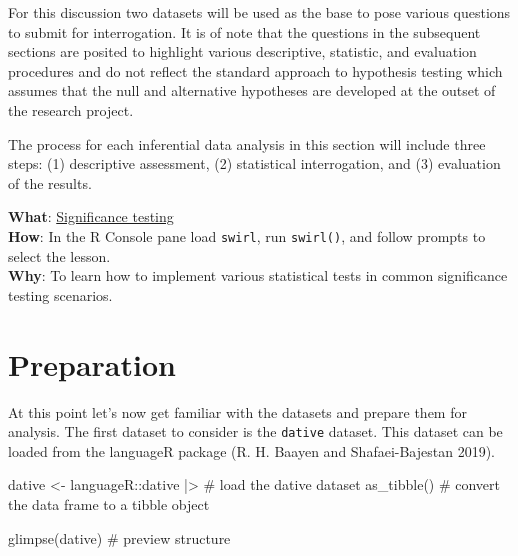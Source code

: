\documentclass[
  letterpaper,
]{latex/krantz}
\newenvironment{Shaded}{\begin{snugshade}}{\end{snugshade}}
\newcommand{\CommentTok}[1]{\textcolor[rgb]{0.37,0.37,0.37}{#1}}
\newcommand{\FunctionTok}[1]{\textcolor[rgb]{0.28,0.35,0.67}{#1}}
\newcommand{\NormalTok}[1]{\textcolor[rgb]{0.00,0.23,0.31}{#1}}
\newcommand{\OtherTok}[1]{\textcolor[rgb]{0.00,0.23,0.31}{#1}}
\newcommand{\SpecialCharTok}[1]{\textcolor[rgb]{0.37,0.37,0.37}{#1}}
\begin{document}
For this discussion two datasets will be used as the base to pose
various questions to submit for interrogation. It is of note that the
questions in the subsequent sections are posited to highlight various
descriptive, statistic, and evaluation procedures and do not reflect the
standard approach to hypothesis testing which assumes that the null and
alternative hypotheses are developed at the outset of the research
project.

The process for each inferential data analysis in this section will
include three steps: (1) descriptive assessment, (2) statistical
interrogation, and (3) evaluation of the results.

\begin{tcolorbox}[enhanced jigsaw, toprule=.15mm, bottomtitle=1mm, coltitle=black, title=\textcolor{quarto-callout-tip-color}{\faLightbulb}\hspace{0.5em}{Swirl}, left=2mm, colframe=quarto-callout-tip-color-frame, bottomrule=.15mm, colbacktitle=quarto-callout-tip-color!10!white, leftrule=.75mm, colback=white, titlerule=0mm, breakable, toptitle=1mm, opacityback=0, arc=.35mm, rightrule=.15mm, opacitybacktitle=0.6]

\textbf{What}: \href{https://github.com/lin380/swirl}{Significance
testing}\\
\textbf{How}: In the R Console pane load \texttt{swirl}, run
\texttt{swirl()}, and follow prompts to select the lesson.\\
\textbf{Why}: To learn how to implement various statistical tests in
common significance testing scenarios.

\end{tcolorbox}

\hypertarget{preparation}{%
\section{Preparation}\label{preparation}}

At this point let's now get familiar with the datasets and prepare them
for analysis. The first dataset to consider is the \texttt{dative}
dataset. This dataset can be loaded from the languageR package (R. H.
Baayen and Shafaei-Bajestan 2019).

\begin{Shaded}
\begin{Highlighting}[]
\NormalTok{dative }\OtherTok{\textless{}{-}} 
\NormalTok{  languageR}\SpecialCharTok{::}\NormalTok{dative }\SpecialCharTok{|\textgreater{}} \CommentTok{\# load the \textasciigrave{}dative\textasciigrave{} dataset  }
  \FunctionTok{as\_tibble}\NormalTok{() }\CommentTok{\# convert the data frame to a tibble object}
  
\FunctionTok{glimpse}\NormalTok{(dative) }\CommentTok{\# preview structure }
\end{Highlighting}
\end{Shaded}
\end{document}
